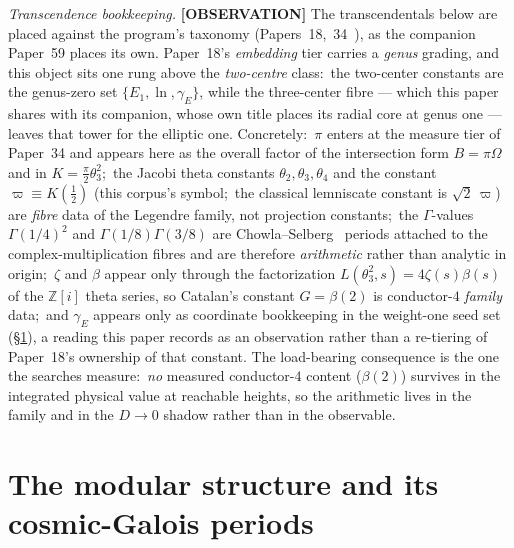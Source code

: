 \documentclass[aps,pra,twocolumn,superscriptaddress,longbibliography]{revtex4-2}
\begin{document}
\emph{Transcendence bookkeeping.}  \textbf{[OBSERVATION]} The transcendentals
below are placed against the program's taxonomy
(Papers~18,~34~\cite{loutey_paper18,loutey_paper34}), as the companion Paper~59
places its own.  Paper~18's \emph{embedding} tier carries a \emph{genus} grading, and this
object sits one rung above the \emph{two-centre} class:\ the two-center
constants are the genus-zero set $\{E_{1},\ln,\gamma_{E}\}$, while the
three-center fibre --- which this paper shares with its companion, whose own
title places its radial core at genus one --- leaves that tower for the elliptic one.  Concretely:\ $\pi$ enters at the measure
tier of Paper~34 and appears here as the overall factor of the intersection form
$B=\pi\Omega$ and in $K=\tfrac{\pi}{2}\theta_{3}^{2}$;\ the Jacobi theta
constants $\theta_{2},\theta_{3},\theta_{4}$ and the constant
$\varpi\equiv K(\tfrac12)$ (this corpus's symbol;\ the classical
lemniscate constant is $\sqrt2\,\varpi$) are \emph{fibre} data of the Legendre family, not
projection constants;\ the $\Gamma$-values $\Gamma(1/4)^{2}$ and
$\Gamma(1/8)\Gamma(3/8)$ are Chowla--Selberg~\cite{chowla_selberg1967} periods attached to the
complex-multiplication fibres and are therefore \emph{arithmetic} rather than
analytic in origin;\ $\zeta$ and $\beta$ appear only through the factorization
$L(\theta_{3}^{2},s)=4\zeta(s)\beta(s)$ of the $\mathbb{Z}[i]$ theta series, so
Catalan's constant $G=\beta(2)$ is conductor-$4$ \emph{family} data;\ and
$\gamma_{E}$ appears only as coordinate bookkeeping in the weight-one seed set
(\S\ref{sec:modular}), a reading this paper records as an observation
rather than a re-tiering of Paper~18's ownership of that constant.  The
load-bearing consequence is the one the searches measure:\ \emph{no} measured
conductor-$4$ content ($\beta(2)$) survives in the integrated physical value at
reachable heights, so the arithmetic lives in the family and in the $D\to0$
shadow rather than in the observable.

\section{The modular structure and its cosmic-Galois periods}
\label{sec:modular}
\end{document}
